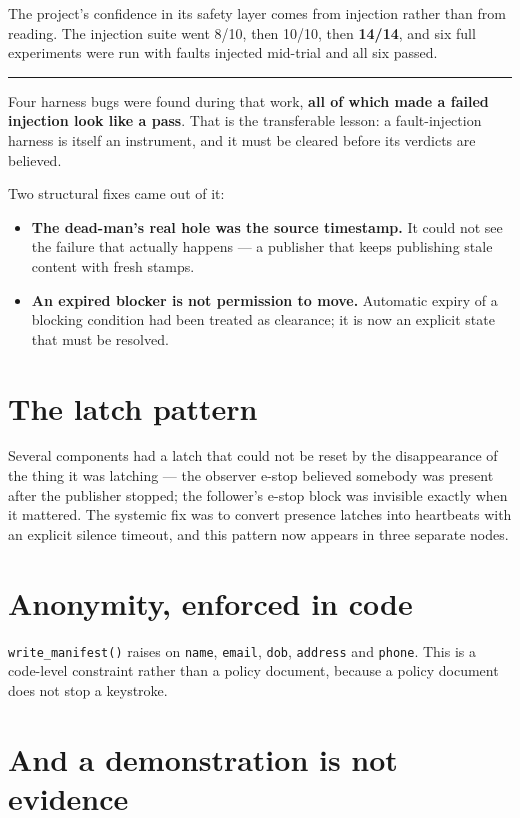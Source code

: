 \documentclass[11pt,a4paper,oneside]{report}
\newcommand{\code}[1]{\texttt{\small #1}}
\newcommand{\keyfact}[1]{%
  \par\vspace{7pt}\noindent
  \hspace*{0pt}\textcolor{srlblue}{\rule{2.5pt}{\dimexpr\baselineskip\relax}}%
  \hspace{9pt}%
  \begin{minipage}[t]{\dimexpr\textwidth-14pt\relax}
  \small #1
  \end{minipage}\par\vspace{7pt}}
\begin{document}
The project's confidence in its safety layer comes from injection rather than
from reading. The injection suite went 8/10, then 10/10, then \textbf{14/14},
and six full experiments were run with faults injected mid-trial and all six
passed.

\keyfact{Four harness bugs were found during that work, \textbf{all of which
made a failed injection look like a pass}. That is the transferable lesson: a
fault-injection harness is itself an instrument, and it must be cleared before
its verdicts are believed.}

Two structural fixes came out of it:

\begin{itemize}
\item \textbf{The dead-man's real hole was the source timestamp.} It could not
      see the failure that actually happens --- a publisher that keeps
      publishing stale content with fresh stamps.
\item \textbf{An expired blocker is not permission to move.} Automatic expiry
      of a blocking condition had been treated as clearance; it is now an
      explicit state that must be resolved.
\end{itemize}

\section{The latch pattern}

Several components had a latch that could not be reset by the disappearance of
the thing it was latching --- the observer e-stop believed somebody was present
after the publisher stopped; the follower's e-stop block was invisible exactly
when it mattered. The systemic fix was to convert presence latches into
heartbeats with an explicit silence timeout, and this pattern now appears in
three separate nodes.

\section{Anonymity, enforced in code}

\code{write\_manifest()} raises on \code{name}, \code{email}, \code{dob},
\code{address} and \code{phone}. This is a code-level constraint rather than a
policy document, because a policy document does not stop a keystroke.

\section{And a demonstration is not evidence}
\end{document}
